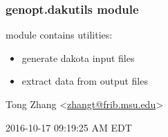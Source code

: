 \documentclass[letterpaper,10pt,english]{sphinxmanual}
\begin{document}

\begin{fulllineitems}
\label{\detokenize{src/apidocs/dakopt:genopt.dakopt.test_dakotaoc1}}
\end{fulllineitems}


\begin{fulllineitems}
\label{\detokenize{src/apidocs/dakopt:genopt.dakopt.test_dakotaoc2}}
\end{fulllineitems}



\subsubsection{genopt.dakutils module}
\label{\detokenize{src/apidocs/dakutils:genopt-dakutils-module}}\label{\detokenize{src/apidocs/dakutils::doc}}\label{\detokenize{src/apidocs/dakutils:module-genopt.dakutils}}
module contains utilities:
\begin{itemize}
\item {} 
generate dakota input files

\item {} 
extract data from output files

\end{itemize}

Tong Zhang \textless{}\href{mailto:zhangt@frib.msu.edu}{zhangt@frib.msu.edu}\textgreater{}

2016-10-17 09:19:25 AM EDT
\end{document}
